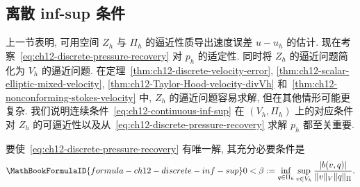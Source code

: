 \subsection{离散 inf-sup 条件}
\label{sec:ch12-discrete-inf-sup}
\setcounter{thmcount}{0}
\setcounter{equation}{0}

上一节表明, 可用空间 $Z_h$ 与 $\Pi_h$ 的逼近性质导出速度误差 $u-u_h$ 的估计. 现在考察~\eqref{eq:ch12-discrete-pressure-recovery} 对 $p_h$ 的适定性. 同时将 $Z_h$ 的逼近问题简化为 $V_h$ 的逼近问题. 在定理~\ref{thm:ch12-discrete-velocity-error}, \ref{thm:ch12-scalar-elliptic-mixed-velocity}, \ref{thm:ch12-Taylor-Hood-velocity-divVh} 和~\ref{thm:ch12-nonconforming-stokes-velocity} 中, $Z_h$ 的逼近问题容易求解, 但在其他情形可能更复杂. 我们说明连续条件~\eqref{eq:ch12-continuous-inf-sup} 在 $(V_h,\Pi_h)$ 上的对应条件对 $Z_h$ 的可逼近性以及从~\eqref{eq:ch12-discrete-pressure-recovery} 求解 $p_h$ 都至关重要.

\begin{Lemma}
\label{lem:ch12-discrete-inf-sup}
要使~\eqref{eq:ch12-discrete-pressure-recovery} 有唯一解, 其充分必要条件是
\begin{equation}
\MathBookFormulaID{formula-ch12-discrete-inf-sup}
\label{eq:ch12-discrete-inf-sup}
0<\beta:=\inf_{q\in\Pi_h}\sup_{v\in V_h}
\frac{|b(v,q)|}{\|v\|_V\|q\|_\Pi}.
\end{equation}
\end{Lemma}

